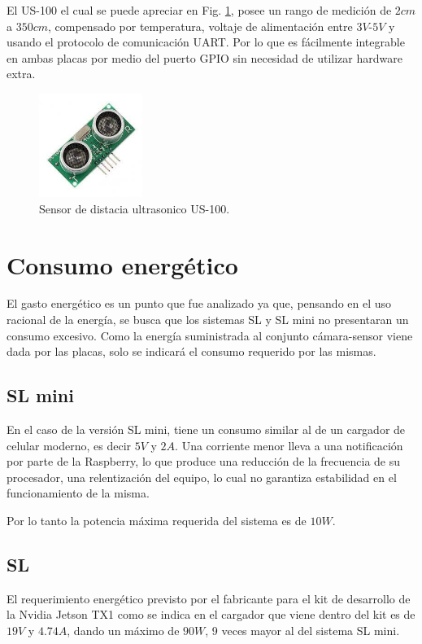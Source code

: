 El US-100 el cual se puede apreciar en Fig. \ref{fig:sensor-US100}, posee un rango de medición de $2cm$ a $350cm$, compensado por temperatura, voltaje de alimentación entre $3V$-$5V$ y usando el protocolo de
comunicación UART.
Por lo que es fácilmente integrable en ambas placas por medio del puerto GPIO sin necesidad de utilizar hardware extra.
\begin{figure}
    \centering
    \includegraphics[width=0.3\textwidth]{imgs/us-100.jpg}
    \caption{Sensor de distacia ultrasonico US-100.}
    \label{fig:sensor-US100}
\end{figure}

\section{Consumo energético}

El gasto energético es un punto que fue analizado ya que, pensando en el uso racional de la energía, se busca que los sistemas SL y SL mini no presentaran un consumo excesivo.
Como la energía suministrada al conjunto cámara-sensor viene dada por las placas, solo se indicará el consumo requerido por las mismas.


\subsection{SL mini}

En el caso de la versión SL mini, tiene un consumo similar al de un cargador de celular moderno, es decir $5V$ y
$2A$.
Una corriente menor lleva a una notificación por parte de la Raspberry, lo que produce una reducción de la frecuencia de su procesador, una relentización del equipo, lo cual no garantiza estabilidad en el funcionamiento de la misma.

Por lo tanto la potencia máxima requerida del sistema es de $10W$.

\subsection{SL}

El requerimiento energético previsto por el fabricante para el kit de desarrollo de la Nvidia Jetson TX1 como se indica
en el cargador que viene dentro del kit es de $19V$ y $4.74A$, dando un máximo de $90W$, 9 veces mayor al del sistema SL mini.

